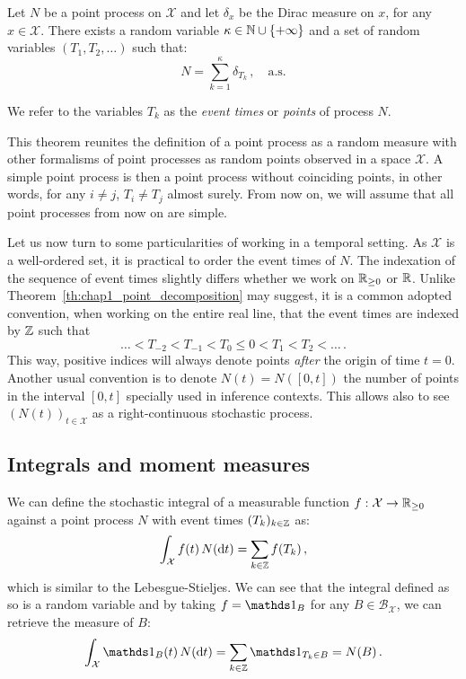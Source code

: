 \begin{theorem}{\parencite[Corollary 6.5]{Last2017}}\label{th:chap1_point_decomposition}

    Let $N$ be a point process on $\mathcal{X}$ and let $\delta_x$ be the Dirac measure on $x$, for any $x\in\mathcal{X}$.
    There exists a random variable $\kappa\in{\mathbb N}\cup \{+\infty\}$ and a set of random variables $(T_1, T_2, \ldots)$ such that:
    \[N = \sum_{k=1}^{\kappa}{\delta_{T_k}}\,,\quad \text{a.s.}\]  

    We refer to the variables $T_k$ as the \emph{event times} or \emph{points} of process $N$.
\end{theorem}
This theorem reunites the definition of a point process as a random measure with other formalisms of point processes as random points observed in a space $\mathcal{X}$.
A simple point process is then a point process without coinciding points, in other words, for any $i\neq j$, $T_i \neq T_j$ almost surely.
From now on, we will assume that all point processes from now on are simple.

Let us now turn to some particularities of working in a temporal setting. As $\mathcal{X}$ is a well-ordered set, it is practical to order the event times of $N$.
The indexation of the sequence of event times slightly differs whether we work on ${\mathbb R}_{\geq 0}$ or ${\mathbb R}$. 
Unlike Theorem~\ref{th:chap1_point_decomposition} may suggest, it is a common adopted convention, when working on the entire real line, that the event times are indexed by ${\mathbb Z}$ such that \[\ldots < T_{-2} < T_{-1} < T_{0} \leq 0 < T_1 < T_2 < \ldots\,.\]
This way, positive indices will always denote points \emph{after} the origin of time $t=0$.
Another usual convention is to denote $N(t) = N([0, t])$ the number of points in the interval $[0, t]$ specially used in inference contexts.
This allows also to see $(N(t))_{t\in\mathcal{X}}$ as a right-continuous stochastic process.

\subsection{Integrals and moment measures}

We can define the stochastic integral of a measurable function $f:\mathcal{X}\to {\mathbb R}_{\geq 0}$ against a point process $N$ with event times $(T_k)_{k\in{\mathbb Z}}$ as:
\[\int_{\mathcal{X}}{f(t)\, N({\mathrm{d}} t)} = \sum_{k\in{\mathbb Z}}{f(T_k)}\,,\]
which is similar to the Lebesgue-Stieljes.
We can see that the integral defined as so is a random variable and by taking $f=\II_{B}$ for any $B\in\mathcal{B}_{\mathcal{X}}$, we can retrieve the measure of $B$:
\[\int_{\mathcal{X}}{\II_{B}(t)\, N(\dd t)} = \sum_{k\in\ZZ}{\II_{T_k \in B}} = N(B)\,.\]

